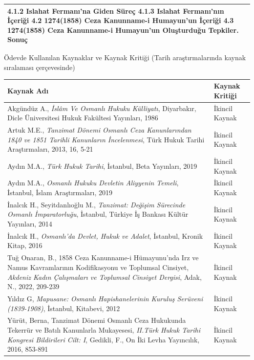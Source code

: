 \documentclass{assignment}
\begin{document}
\begin{longtable}{|p{}|p{}|}
\hspace*{1em}\hspace*{1em} 4.1.2 Islahat Fermanı'na Giden Süreç\newline
\hspace*{1em}\hspace*{1em} 4.1.3 Islahat Fermanı'nın İçeriği\newline
\hspace*{1em} 4.2 1274(1858) Ceza Kanunname-i Humayun'un İçeriği\newline
\hspace*{1em} 4.3 1274(1858) Ceza Kanunname-i Humayun'un Oluşturduğu Tepkiler\newline
5. Sonuç
\\ \hline 
\end{longtable}
\newpage
Ödevde Kullanılan Kaynaklar ve Kaynak Kritiği (Tarih araştırmalarında kaynak sıralaması çerçevesinde)
\begin{longtable}{|p{}|p{}|}
\hline
Kaynak Adı & Kaynak Kritiği
\\ 
\hline
Akgündüz A., \textit{İslâm Ve Osmanlı Hukuku Külliyatı}, Diyarbakır, Dicle Üniversitesi Hukuk Fakültesi Yayınları, 1986 & İkincil Kaynak
\\
\hline
Artuk M.E., \textit{Tanzimat Dönemi Osmanlı Ceza Kanunlarından 1840 ve 1851 Tarihli Kanunların İncelenmesi}, Türk Hukuk Tarihi Araştırmaları, 2013, 16, 5-21 & İkincil Kaynak
\\
\hline
Aydın M.A., \textit{Türk Hukuk Tarihi}, İstanbul, Beta Yayınları, 2019 & İkincil Kaynak
\\
\hline
Aydın M.A., \textit{Osmanlı Hukuku Devletin Aliyyenin Temeli}, İstanbul, İslam Araştırmaları, 2019 & İkincil Kaynak
\\
\hline
İnalcık H., Seyitdanlıoğlu M., \textit{Tanzimat: Değişim Sürecinde Osmanlı İmparatorluğu}, İstanbul, Türkiye İş Bankası Kültür Yayınları, 2014 & İkincil Kaynak
\\
\hline
İnalcık H., \textit{Osmanlı'da Devlet, Hukuk ve Adalet}, İstanbul, Kronik Kitap, 2016 & İkincil Kaynak
\\
\hline
Tuğ Onaran, B., 1858 Ceza Kanunname-i Hümayunu’nda Irz ve Namus Kavramlarının Kodifikasyonu ve Toplumsal Cinsiyet, \textit{Akdeniz Kadın Çalışmaları ve Toplumsal Cinsiyet Dergisi}, Adak, N., 2022, 209-239 & İkincil Kaynak
\\
\hline
Yıldız G, \textit{Mapusane: Osmanlı Hapishanelerinin Kuruluş Serüveni (1839-1908)}, İstanbul, Kitabevi, 2012 & İkincil Kaynak
\\
\hline
Yürüt, Berna, Tanzimat Dönemi Osmanlı Ceza Hukukunda Tekerrür ve Batılı Kanunlarla Mukayesesi, \textit{II.Türk Hukuk Tarihi Kongresi Bildirileri Cilt: I}, Gedikli, F., On İki Levha Yayıncılık, 2016, 853-891 & İkincil Kaynak
\\
\hline
\end{longtable}
\end{document}
